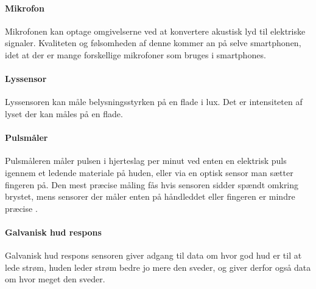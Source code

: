 \paragraph{Mikrofon}
Mikrofonen kan optage omgivelserne ved at konvertere akustisk lyd til elektriske signaler. Kvaliteten og følsomheden af denne kommer an på selve smartphonen, idet at der er mange forskellige mikrofoner som bruges i smartphones. 

\paragraph{Lyssensor}
Lyssensoren kan måle belysningsstyrken på en flade i lux. Det er intensiteten af lyset der kan måles på en flade.

\paragraph{Pulsmåler}
Pulsmåleren måler pulsen i hjerteslag per minut ved enten en elektrisk puls igennem et ledende materiale på huden, eller via en optisk sensor man sætter fingeren på.
Den mest præcise måling fås hvis sensoren sidder spændt omkring brystet, mens sensorer der måler enten på håndleddet eller fingeren er mindre præcise \citep{burke1998precision}.

\paragraph{Galvanisk hud respons}
Galvanisk hud respons sensoren giver adgang til data om hvor god hud er til at lede strøm, huden leder strøm bedre jo mere den sveder, og giver derfor også data om hvor meget den sveder.